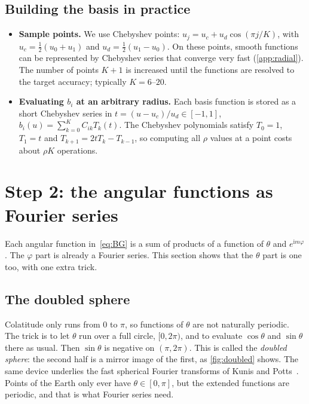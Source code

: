 \documentclass[11pt,a4paper]{article}
\theoremstyle{definition}
\newcommand{\ii}{\mathrm{i}}
\begin{document}
\subsection{Building the basis in practice}
\begin{itemize}
\item \textbf{Sample points.} We use Chebyshev points: $u_j=u_c+u_d\cos(\pi j/K)$, with $u_c=\tfrac12(u_0+u_1)$ and
  $u_d=\tfrac12(u_1-u_0)$. On these points, smooth functions can be represented by Chebyshev series that converge very
  fast (\cref{app:radial}). The number of points $K+1$ is increased until the functions are resolved to the target
  accuracy; typically $K=6$--$20$.
\item \textbf{Evaluating $b_i$ at an arbitrary radius.} Each basis function is stored as a short Chebyshev series in $t=(u-u_c)/u_d\in[-1,1]$,
  $b_i(u)=\sum_{k=0}^{K}C_{ik}T_k(t)$. The Chebyshev polynomials satisfy $T_0=1$, $T_1=t$ and $T_{k+1}=2tT_k-T_{k-1}$, so
  computing all $\rho$ values at a point costs about $\rho K$ operations.
\end{itemize}

\section{Step 2: the angular functions as Fourier series}\label{sec:step2}

Each angular function in~\eqref{eq:BG} is a sum of products of a function of $\theta$ and $e^{\ii m\varphi}$.
The $\varphi$ part is already a Fourier series. This section shows that the $\theta$ part is one too, with one extra trick.

\subsection{The doubled sphere}
Colatitude only runs from $0$ to $\pi$, so functions of $\theta$ are not naturally periodic. The trick is to let
$\theta$ run over a full circle, $[0,2\pi)$, and to evaluate $\cos\theta$ and $\sin\theta$ there as usual. Then
$\sin\theta$ is negative on $(\pi,2\pi)$. This is called the \emph{doubled sphere}: the second half is a mirror
image of the first, as \cref{fig:doubled} shows. The same device underlies the fast spherical Fourier transforms of Kunis and Potts~\cite{kunis2003}. Points of the Earth only ever have $\theta\in[0,\pi]$, but the extended
functions are periodic, and that is what Fourier series need.
\end{document}
